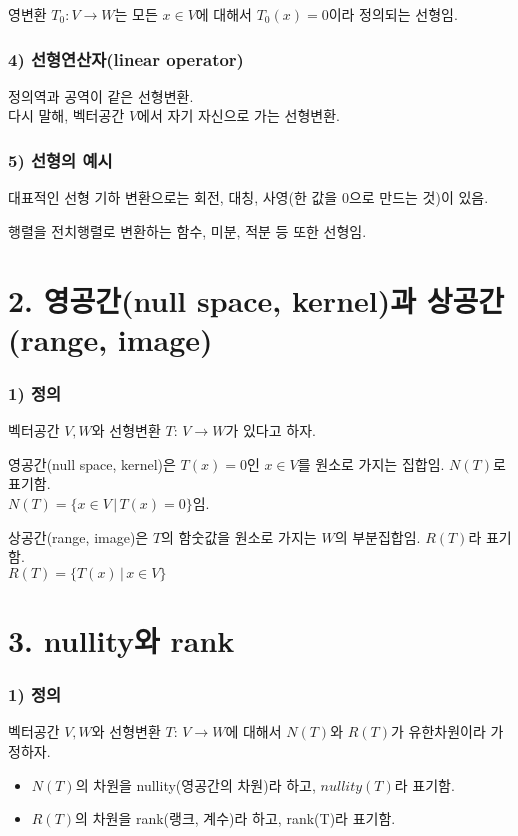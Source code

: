 \documentclass[10pt, a4paper]{article}
\begin{document}
영변환 $T_0 : V \rightarrow W$는 모든 $x \in V$에 대해서 $T_0(x)=0$이라 정의되는 선형임.

\subsubsection*{4) 선형연산자(linear operator)}
정의역과 공역이 같은 선형변환.\\
다시 말해, 벡터공간 $V$에서 자기 자신으로 가는 선형변환.

\subsubsection*{5) 선형의 예시}
대표적인 선형 기하 변환으로는 회전, 대칭, 사영(한 값을 0으로 만드는 것)이 있음.

행렬을 전치행렬로 변환하는 함수, 미분, 적분 등 또한 선형임.\\


\newpage


\section*{2. 영공간(null space, kernel)과 상공간(range, image)}

\subsubsection*{1) 정의}
벡터공간 $V, W$와 선형변환 $T:\,V \rightarrow W$가 있다고 하자.

영공간(null space, kernel)은 $T(x)=0$인 $x \in V$를 원소로 가지는 집합임. $N(T)$로 표기함.\\$N(T)=\{x \in V\,|\,T(x)=0\}$임.

상공간(range, image)은 $T$의 함숫값을 원소로 가지는 $W$의 부분집합임. $R(T)$라 표기함.\\$R(T)=\{T(x)\,|\,x \in V\}$\\


\section*{3. nullity와 rank}
\subsubsection*{1) 정의}
벡터공간 $V,W$와 선형변환 $T:\,V \rightarrow W$에 대해서 $N(T)$와 $R(T)$가 유한차원이라 가정하자.

\begin{itemize}
    \item $N(T)$의 차원을 nullity(영공간의 차원)라 하고, $nullity(T)$라 표기함.
    \item $R(T)$의 차원을 rank(랭크, 계수)라 하고, rank(T)라 표기함.\\
\end{itemize}
\end{document}
